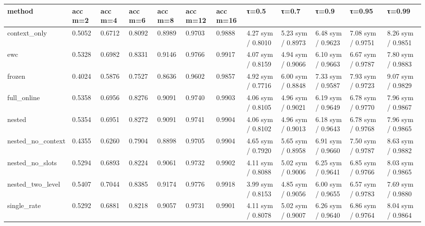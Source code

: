 \begin{tabular}{llllllllllll}
\hline
method & acc m=2 & acc m=4 & acc m=6 & acc m=8 & acc m=12 & acc m=16 & τ=0.5 & τ=0.7 & τ=0.9 & τ=0.95 & τ=0.99 \\
\hline
context\_only & 0.5052 & 0.6712 & 0.8092 & 0.8989 & 0.9703 & 0.9888 & 4.27 sym / 0.8010 & 5.23 sym / 0.8973 & 6.48 sym / 0.9623 & 7.08 sym / 0.9751 & 8.26 sym / 0.9851 \\
ewc & 0.5328 & 0.6982 & 0.8331 & 0.9146 & 0.9766 & 0.9917 & 4.07 sym / 0.8159 & 4.94 sym / 0.9066 & 6.10 sym / 0.9663 & 6.67 sym / 0.9787 & 7.80 sym / 0.9883 \\
frozen & 0.4024 & 0.5876 & 0.7527 & 0.8636 & 0.9602 & 0.9857 & 4.92 sym / 0.7716 & 6.00 sym / 0.8848 & 7.33 sym / 0.9587 & 7.93 sym / 0.9723 & 9.07 sym / 0.9829 \\
full\_online & 0.5358 & 0.6956 & 0.8276 & 0.9091 & 0.9740 & 0.9903 & 4.06 sym / 0.8105 & 4.96 sym / 0.9021 & 6.19 sym / 0.9649 & 6.78 sym / 0.9770 & 7.96 sym / 0.9867 \\
nested & 0.5354 & 0.6951 & 0.8272 & 0.9091 & 0.9741 & 0.9904 & 4.06 sym / 0.8102 & 4.96 sym / 0.9013 & 6.18 sym / 0.9643 & 6.78 sym / 0.9768 & 7.96 sym / 0.9865 \\
nested\_no\_context & 0.4355 & 0.6260 & 0.7904 & 0.8898 & 0.9705 & 0.9904 & 4.65 sym / 0.7920 & 5.65 sym / 0.8958 & 6.91 sym / 0.9660 & 7.50 sym / 0.9787 & 8.63 sym / 0.9882 \\
nested\_no\_slots & 0.5294 & 0.6893 & 0.8224 & 0.9061 & 0.9732 & 0.9902 & 4.11 sym / 0.8088 & 5.02 sym / 0.9006 & 6.25 sym / 0.9641 & 6.85 sym / 0.9766 & 8.03 sym / 0.9865 \\
nested\_two\_level & 0.5407 & 0.7044 & 0.8385 & 0.9174 & 0.9776 & 0.9918 & 3.99 sym / 0.8153 & 4.85 sym / 0.9056 & 6.00 sym / 0.9655 & 6.57 sym / 0.9783 & 7.69 sym / 0.9880 \\
single\_rate & 0.5292 & 0.6881 & 0.8218 & 0.9057 & 0.9731 & 0.9901 & 4.11 sym / 0.8078 & 5.02 sym / 0.9007 & 6.26 sym / 0.9640 & 6.86 sym / 0.9764 & 8.04 sym / 0.9864 \\
\hline
\end{tabular}

